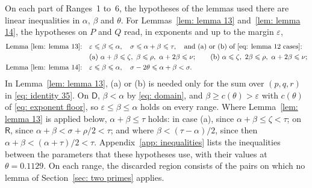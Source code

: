 \documentclass{article}
\numberwithin{equation}{section}
\newcommand{\Le}{\leqslant}
\newcommand{\Ge}{\geqslant}
\begin{document}
On each part of Ranges~1 to~6, the hypotheses of the lemmas used there are linear inequalities in $\alpha$, $\beta$ and $\theta$. For Lemmas~\ref{lem: lemma 13} and~\ref{lem: lemma 14}, the hypotheses on $P$ and $Q$ read, in exponents and up to the margin $\varepsilon$,
\begin{equation}
\label{eq: exponent hypotheses}
\begin{aligned}
&\text{Lemma~\ref{lem: lemma 13}:} && \varepsilon \Le \beta \Le \alpha, \quad \sigma \Le \alpha + \beta \Le \tau, \quad \text{and (a) or (b) of \eqref{eq: lemma 12 cases}:} \\
& && \text{(a)}\ \alpha + \beta \Le \zeta,\ \beta \Le \rho,\ \alpha + 2\beta \Le \nu; \qquad \text{(b)}\ \alpha \Le \zeta,\ 2\beta \Le \rho,\ \alpha + 2\beta \Le \nu; \\
&\text{Lemma~\ref{lem: lemma 14}:} && \varepsilon \Le \beta \Le \alpha, \quad \sigma - 2\theta \Le \alpha + \beta < \sigma.
\end{aligned}
\end{equation}
In Lemma~\ref{lem: lemma 13}, (a) or (b) is needed only for the sum over $(p, q, r)$ in \eqref{eq: identity 35}. On $\mathsf{D}$, $\beta < \alpha$ by \eqref{eq: domain}, and $\beta \Ge c(\theta) > \varepsilon$ with $c(\theta)$ of \eqref{eq: exponent floor}, so $\varepsilon \Le \beta \Le \alpha$ holds on every range. Where Lemma~\ref{lem: lemma 13} is applied below, $\alpha + \beta \Le \tau$ holds: in case (a), since $\alpha + \beta \Le \zeta < \tau$; on $\mathsf{R}$, since $\alpha + \beta < \sigma + \rho/2 < \tau$; and where $\beta < (\tau - \alpha)/2$, since then $\alpha + \beta < (\alpha + \tau)/2 < \tau$. Appendix~\ref{app: inequalities} lists the inequalities between the parameters that these hypotheses use, with their values at $\theta = 0.1129$. On each range, the discarded region consists of the pairs on which no lemma of Section~\ref{sec: two primes} applies.
\end{document}
